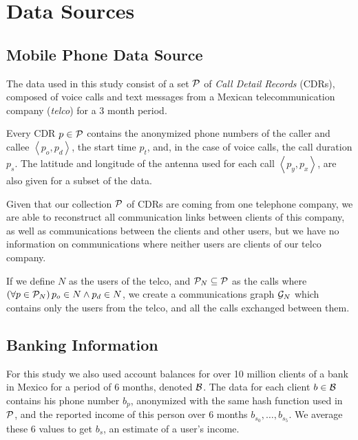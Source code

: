 \section{Data Sources} \label{data_sources}

\subsection{Mobile Phone Data Source}

The data used in this study consist of a set \( \mathcal{P} \) of \textit{Call Detail Records} (CDRs), composed of voice calls and text messages from a Mexican telecommunication company (\textit{telco}) for a 3 month period.

Every CDR \( p \in \mathcal{P} \)  contains the anonymized phone numbers of the caller and callee \( \left< p_o, p_d \right> \), the start time \( p_t \), and, in the case of voice calls, the call duration \( p_s \). The latitude and longitude of the antenna used for each call \( \left< p_y, p_x \right> \), are also given for a subset of the data.

Given that our collection \( \mathcal{P} \) of CDRs are coming from one telephone company, we are able to reconstruct all communication links between clients of this company, as well as communications between the clients and other users, but we have no information on communications where neither users are clients of our telco company.

If we define \( N \) as the users of the telco, and \( \mathcal{P}_N \subseteq \mathcal{P} \) as the calls where \( \left( \forall p \in \mathcal{P}_N \right) p_o \in N \wedge p_d \in N \), we create a communications graph \( \mathcal{G}_N \) which contains only the users from the telco, and all the calls exchanged between them.


\subsection{Banking Information}

For this study we also used account balances for over 10 million clients of a bank in Mexico for a period of 6 months, denoted \( \mathcal{B} \). The data for each client \( b \in \mathcal{B} \) contains his phone number \( b_p \), anonymized with the same hash function used in \( \mathcal{P} \), and the reported income of this person over 6 months \( b_{s_0}, \ldots, b_{s_5} \). We average these 6 values to get \( b_s \), an estimate of a user's income.

